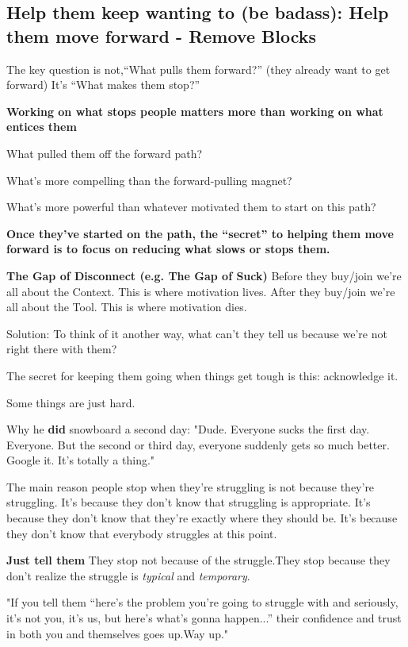 \subsection{Help them keep wanting to (be badass): Help them move forward - Remove Blocks}
The key question is not,“What pulls them forward?” (they already want to get forward) It’s “What makes them stop?”

\textbf{Working on what stops people matters more than working on what entices them}


What pulled them off the forward path?

What’s more compelling than the forward-pulling magnet?

What’s more powerful than whatever motivated them to start on this path?

\textbf{Once they’ve started on the path, the “secret” to helping them move forward is to focus on reducing what slows or stops them.}

\textbf{The Gap of Disconnect (e.g. The Gap of Suck)}
Before they buy/join we’re all about the Context. This is where motivation lives.
After they buy/join we’re all about the Tool. This is where motivation dies.

Solution: To think of it another way, what can’t they tell us because we’re not right there with them?

The secret for keeping them going when things get tough is this: acknowledge it.

Some things are just hard.

Why he \textbf{did} snowboard a second day: "Dude. Everyone sucks the first day. Everyone. But the second or third day, everyone suddenly gets so much better. Google it. It’s totally a thing."

The main reason people stop when they’re struggling is not because they’re struggling.
It’s because they don’t know that struggling is appropriate.
It’s because they don’t know that they’re exactly where they should be.
It’s because they don’t know that everybody struggles at this point.

\textbf{Just tell them}
They stop not because of the struggle.They stop because they don’t realize the struggle is \textit{typical} and \textit{temporary}.

"If you tell them “here’s the problem you’re going to struggle with and seriously, it’s
not you, it’s us, but here’s what’s gonna happen...” their confidence and trust in both you and themselves goes up.Way up."

